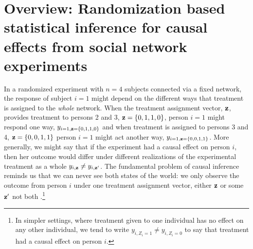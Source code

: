 

\section{Overview: Randomization based statistical inference for causal effects from social network experiments}

In a randomized experiment with $n=4$ subjects connected via a fixed network,
the response of subject $i=1$ might depend on the different ways that
treatment is assigned to the \emph{whole} network. When the treatment
assignment vector, $\mathbf{z}$, provides treatment to persons 2 and 3,
$\mathbf{z}=\{0,1,1,0\}$, person $i=1$ might respond one way,
$y_{i=1,\mathbf{z}=\{0,1,1,0\}}$ and when treatment is assigned to persons 3 and 4,
$\mathbf{z}=\{0,0,1,1\}$ person $i=1$ might act another way,
$y_{i=1,\mathbf{z}=\{0,0,1,1\}}$. More generally, we might say that if the experiment had a causal effect on
person $i$, then her outcome would differ under different realizations of the
experimental treatment as a whole $y_{i,\mathbf{z}} \ne y_{i,\mathbf{z}'}$. The fundamental problem of
causal inference reminds us that we can never see both states of the world: we
only observe the outcome from person $i$ under one treatment assignment
vector, either $\mathbf{z}$ or some $\mathbf{z}'$ not both
\citep{holland:1986a,brady2008cae}.\footnote{In simpler settings, where
  treatment given to one individual has no effect on any other individual, we tend to
  write $y_{i,Z_i=1} \ne y_{i,Z_i=0}$ to say that treatment had a causal
  effect on person $i$.}

